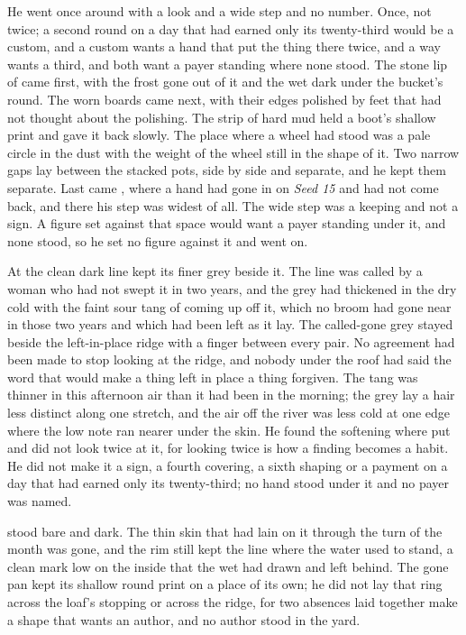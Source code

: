 He went once around  with a look and a wide step and no number. Once, not twice; a second round on a day that had earned only its twenty-third would be a custom, and a custom wants a hand that put the thing there twice, and a way wants a third, and both want a payer standing where none stood. The stone lip of  came first, with the frost gone out of it and the wet dark under the bucket's round. The worn boards came next, with their edges polished by feet that had not thought about the polishing. The strip of hard mud held a boot's shallow print and gave it back slowly. The place where a wheel had stood was a pale circle in the dust with the weight of the wheel still in the shape of it. Two narrow gaps lay between the stacked pots, side by side and separate, and he kept them separate. Last came , where a hand had gone in on \emph{Seed 15} and had not come back, and there his step was widest of all. The wide step was a keeping and not a sign. A figure set against that space would want a payer standing under it, and none stood, so he set no figure against it and went on.

At  the clean dark line kept its finer grey beside it. The line was called  by a woman who had not swept it in two years, and the grey had thickened in the dry cold with the faint sour tang of  coming up off it, which no broom had gone near in those two years and which had been left as it lay. The called-gone grey stayed beside the left-in-place ridge with a finger between every pair. No agreement had been made to stop looking at the ridge, and nobody under the roof had said the word that would make a thing left in place a thing forgiven. The tang was thinner in this afternoon air than it had been in the morning; the grey lay a hair less distinct along one stretch, and the air off the river was less cold at one edge where the low note ran nearer under the skin. He found the softening where put and did not look twice at it, for looking twice is how a finding becomes a habit. He did not make it a sign, a fourth covering, a sixth shaping or a payment on a day that had earned only its twenty-third; no hand stood under it and no payer was named.

 stood bare and dark. The thin skin that had lain on it through the turn of the month was gone, and the rim still kept the line where the water used to stand, a clean mark low on the inside that the wet had drawn and left behind. The gone pan kept its shallow round print on a place of its own; he did not lay that ring across the loaf's stopping or across the ridge, for two absences laid together make a shape that wants an author, and no author stood in the yard.

